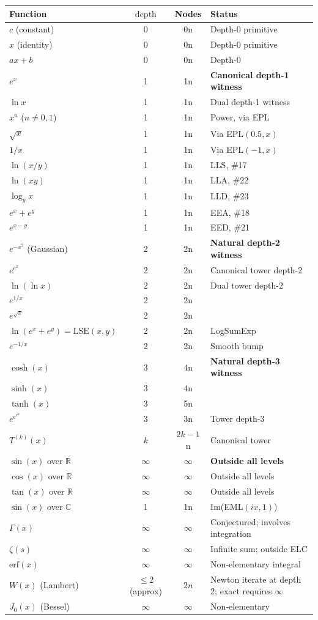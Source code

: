 \documentclass[11pt]{article}
\begin{document}
\begin{longtable}{lccl}
\toprule
Function & $\mathrm{depth}$ & Nodes & Status \\
\midrule
$c$ (constant) & 0 & 0n & Depth-0 primitive \\
$x$ (identity) & 0 & 0n & Depth-0 primitive \\
$ax+b$ & 0 & 0n & Depth-0 \\
$e^x$ & 1 & 1n & \textbf{Canonical depth-1 witness} \\
$\ln x$ & 1 & 1n & Dual depth-1 witness \\
$x^n$ ($n \neq 0,1$) & 1 & 1n & Power, via EPL \\
$\sqrt{x}$ & 1 & 1n & Via EPL$(0.5,x)$ \\
$1/x$ & 1 & 1n & Via EPL$(-1,x)$ \\
$\ln(x/y)$ & 1 & 1n & LLS, \#17 \\
$\ln(xy)$ & 1 & 1n & LLA, \#22 \\
$\log_y x$ & 1 & 1n & LLD, \#23 \\
$e^x + e^y$ & 1 & 1n & EEA, \#18 \\
$e^{x-y}$ & 1 & 1n & EED, \#21 \\
$e^{-x^2}$ (Gaussian) & 2 & 2n & \textbf{Natural depth-2 witness} \\
$e^{e^x}$ & 2 & 2n & Canonical tower depth-2 \\
$\ln(\ln x)$ & 2 & 2n & Dual tower depth-2 \\
$e^{1/x}$ & 2 & 2n & \\
$e^{\sqrt{x}}$ & 2 & 2n & \\
$\ln(e^x + e^y) = \mathrm{LSE}(x,y)$ & 2 & 2n & LogSumExp \\
$e^{-1/x}$ & 2 & 2n & Smooth bump \\
$\cosh(x)$ & 3 & 4n & \textbf{Natural depth-3 witness} \\
$\sinh(x)$ & 3 & 4n & \\
$\tanh(x)$ & 3 & 5n & \\
$e^{e^{e^x}}$ & 3 & 3n & Tower depth-3 \\
$T^{(k)}(x)$ & $k$ & $2k-1$n & Canonical tower \\
$\sin(x)$ over $\mathbb{R}$ & $\infty$ & $\infty$ & \textbf{Outside all levels} \\
$\cos(x)$ over $\mathbb{R}$ & $\infty$ & $\infty$ & Outside all levels \\
$\tan(x)$ over $\mathbb{R}$ & $\infty$ & $\infty$ & Outside all levels \\
$\sin(x)$ over $\mathbb{C}$ & 1 & 1n & Im(EML$(ix,1)$) \\
$\Gamma(x)$ & $\infty$ & $\infty$ & Conjectured; involves integration \\
$\zeta(s)$ & $\infty$ & $\infty$ & Infinite sum; outside ELC \\
$\mathrm{erf}(x)$ & $\infty$ & $\infty$ & Non-elementary integral \\
$W(x)$ (Lambert) & $\leq 2$ (approx) & $2n$ & Newton iterate at depth 2; exact requires $\infty$ \\
$J_0(x)$ (Bessel) & $\infty$ & $\infty$ & Non-elementary \\
\bottomrule
\end{longtable}
\end{document}
